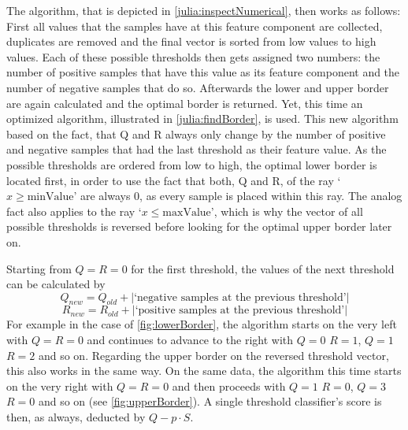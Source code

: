 The algorithm, that is depicted in \autoref{julia:inspectNumerical}, then works as follows:
First all values that the samples have at this feature component are collected, duplicates are removed
and the final vector is sorted from low values to high values.
Each of these possible thresholds then gets assigned two numbers: the number of positive samples that
have this value as its feature component and the number of negative samples that do so.
Afterwards the lower and upper border are again calculated and the optimal border is returned.
Yet, this time an optimized algorithm, illustrated in \autoref{julia:findBorder}, is used.
This new algorithm based on the fact, that Q and R always only change by the number of positive and negative samples that had the
last threshold as their feature value.
As the possible thresholds are ordered from low to high, the optimal lower
border is located first, in order to use the fact that both, Q and R, of the ray `\(x \geq \text{minValue}\)' are always 0,
as every sample is placed within this ray.
The analog fact also applies to the ray `\(x \leq \text{maxValue}\)', which is why the vector
of all possible thresholds is reversed before looking for the optimal upper border later on.

Starting from \(Q=R=0\) for the first threshold, the values of the next threshold can be calculated by
\[Q_{new} = Q_{old} + |\text{`negative samples at the previous threshold'}|\]
\[R_{new} = R_{old} + |\text{`positive samples at the previous threshold'}|\]
For example in the case of \autoref{fig:lowerBorder}, the algorithm starts on the very left
with \(Q=R=0\) and continues to advance to the right with \(Q=0\)  \(R=1\), \(Q=1\) \(R=2\) and so on.
Regarding the upper border on the reversed threshold vector, this also works in the same way.
On the same data, the algorithm this time starts on the very right
with \(Q=R=0\) and then proceeds with \(Q=1\) \(R=0\), \(Q=3\) \(R=0\) and so on (see \autoref{fig:upperBorder}).
A single threshold classifier's score is then, as always, deducted by \(Q - p \cdot S\).

